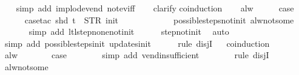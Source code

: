 \begin{isabellebody}
%
\isadelimproof
\ \ %
\endisadelimproof
%
\isatagproof
{}\isamarkupfalse%
\ {\isacharparenleft}simp\ add{\isacharcolon}\ implode{\isacharunderscore}vend\ not{\isacharunderscore}ev{\isacharunderscore}iff{\isacharparenright}\isanewline
\ \ \isamarkupfalse%
\ clarify\isanewline
{}\isamarkupfalse%
{\isacharparenleft}coinduction{\isacharparenright}\isanewline
\ \ \isamarkupfalse%
\ alw\isanewline
\ \ \isamarkupfalse%
\ \isamarkupfalse%
\ {\isacharquery}case\isanewline
\ \ \ \ \isamarkupfalse%
\ {\isacharparenleft}case{\isacharunderscore}tac\ {\isachardoublequoteopen}shd\ t\ {\isacharequal}\ {\isacharparenleft}STR\ {\isacharprime}{\isacharprime}init{\isacharprime}{\isacharprime}{\isacharcomma}\ {\isacharbrackleft}{\isacharbrackright}{\isacharparenright}{\isachardoublequoteclose}{\isacharparenright}\isanewline
\ \ \ \ \ \isamarkupfalse%
\isanewline
\ \ \ \ \isamarkupfalse%
\ possible{\isacharunderscore}steps{\isacharunderscore}not{\isacharunderscore}init\ alw{\isacharunderscore}not{\isacharunderscore}some\isanewline
\ \ \ \ \ \isamarkupfalse%
\ {\isacharparenleft}simp\ add{\isacharcolon}\ ltl{\isacharunderscore}step{\isacharunderscore}none{\isacharunderscore}not{\isacharunderscore}init{\isacharparenright}\isanewline
\ \ \ \ \isamarkupfalse%
\ step{\isacharunderscore}not{\isacharunderscore}init\ \isamarkupfalse%
\ auto{\isacharbrackleft}{}{\isacharbrackright}\isanewline
\ \ \ \ \isamarkupfalse%
\ {\isacharparenleft}simp\ add{\isacharcolon}\ possible{\isacharunderscore}steps{\isacharunderscore}init\ updates{\isacharunderscore}init{\isacharparenright}\isanewline
\ \ \ \ \isamarkupfalse%
\ {\isacharparenleft}rule\ disjI{}{\isacharparenright}\isanewline
\ \ \isamarkupfalse%
{\isacharparenleft}coinduction{\isacharparenright}\isanewline
\ \ \ \ \isamarkupfalse%
\ alw\isanewline
\ \ \ \ \isamarkupfalse%
\ \isamarkupfalse%
\ {\isacharquery}case\isanewline
\ \ \ \ \ \ \isamarkupfalse%
\ {\isacharparenleft}simp\ add{\isacharcolon}\ vend{\isacharunderscore}insufficient{\isacharparenright}\isanewline
\ \ \ \ \ \ \isamarkupfalse%
\ {\isacharparenleft}rule\ disjI{}{\isacharparenright}\isanewline
\ \ \ \ \ \ \isamarkupfalse%
\ alw{\isacharunderscore}not{\isacharunderscore}some\isanewline

\end{isabellebody}
